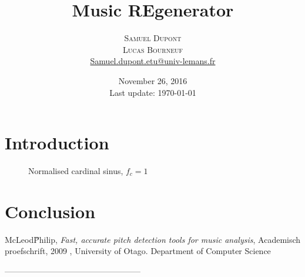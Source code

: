 \documentclass[twoside,twocolumn]{report}
\title{Music REgenerator } %
\author{%
\textsc{Samuel Dupont}\\ %
\textsc{Lucas Bourneuf}\\%
\normalsize \href{mailto:Samuel.dupont.etu@univ-lemans.fr}{Samuel.dupont.etu@univ-lemans.fr } 
}
\date{November 26, 2016 \\ Last update: \today}
\begin{document}
\maketitle


\section{Introduction}


\begin{figure}[h!]
	\centering
	\caption{Normalised cardinal sinus, $f_c=1$}
	\label{sinc}
\end{figure}

\section{Conclusion}

\begin{thebibliography}{99} %



 McLeod\H Philip, \emph{Fast, accurate pitch detection tools for music analysis}, Academisch proefschrift, 2009 , University of Otago. Department of Computer Science


 
\end{thebibliography}--------------------------------------------------



\end{document}
